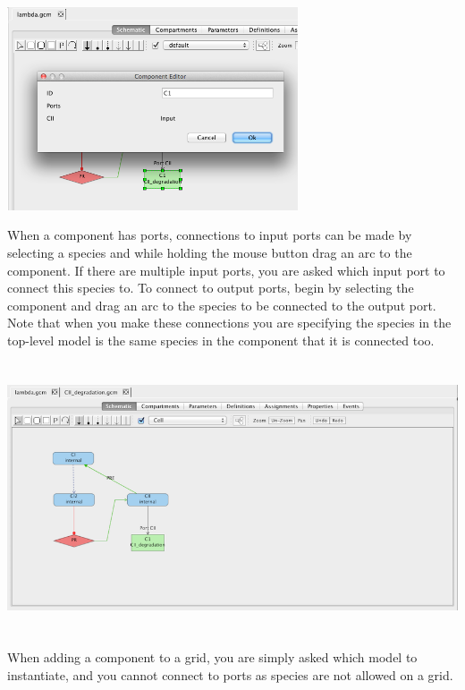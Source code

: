 \documentclass[titlepage,11pt]{article}
\begin{document}
\begin{center}
\includegraphics[height=60mm]{screenshots/editComp}
\end{center}


When a component has ports, connections to input ports can be made by selecting a species and while holding the mouse button drag an arc to the component.  If there are multiple input ports, you are asked which input port to connect this species to.  To connect to output ports, begin by selecting the component and drag an arc to the species to be connected to the output port.  Note that when you make these connections you are specifying the species in the top-level model is the same species in the component that it is connected too.  

\begin{center}
\includegraphics[height=80mm]{screenshots/addPort}
\end{center}

When adding a component to a grid, you are simply asked which model to instantiate, and you cannot connect to ports as species are not allowed on a grid.
\end{document}

